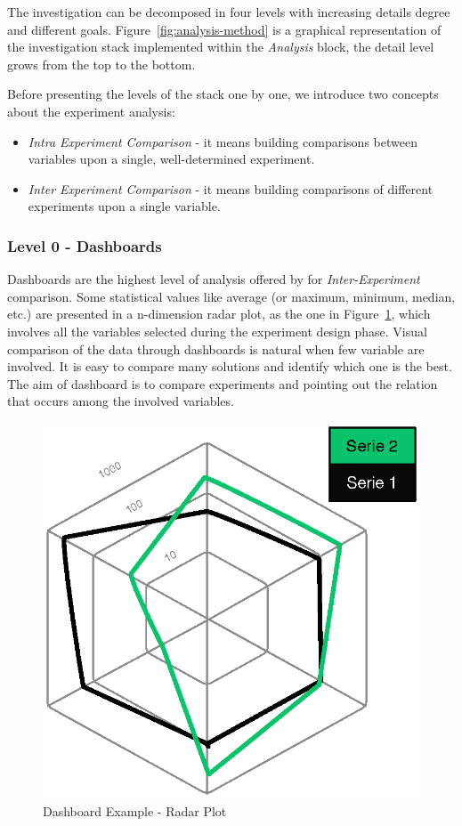 The investigation can be decomposed in four levels with increasing details degree and different goals. Figure~\ref{fig:analysis-method} is a graphical representation of the investigation stack implemented within the \textit{Analysis} block, the detail level grows from the top to the bottom.

\pagebreak

\noindent Before presenting the levels of the stack one by one, we introduce two concepts about the experiment analysis:
\begin{itemize}
\item \textit{Intra Experiment Comparison} -  it means building comparisons between variables upon a single, well-determined experiment.
\item \textit{Inter Experiment Comparison} -  it means building comparisons of different experiments upon a single variable. 
\end{itemize}


\subsubsection{Level 0 - Dashboards}\label{sec:heaven-level0}

Dashboards are the highest level of analysis offered by \name for \textit{Inter-Experiment} comparison. Some statistical values like average (or maximum, minimum, median, etc.) are presented in a n-dimension radar plot, as the one in Figure~\ref{fig:radar}, which involves all the variables selected during the experiment design phase. Visual comparison of the data through dashboards is natural when few variable are involved. It is easy to compare many solutions and identify which one is the best. The aim of dashboard is to compare experiments and pointing out the relation that occurs among the involved variables.

\begin{figure}[tbh]
  \centering
	\includegraphics[width=0.5\linewidth]{images/radar-plot}
	\caption{Dashboard Example - Radar Plot} 	
  	\label{fig:radar}
\end{figure}

